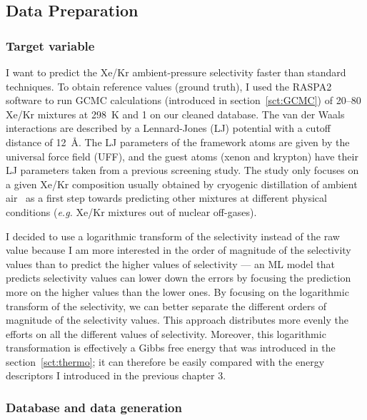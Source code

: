 \documentclass[main]{subfiles}
\begin{document}
\subsection{Data Preparation}


\subsubsection{Target variable}

I want to predict the Xe/Kr ambient-pressure selectivity faster than standard techniques. To obtain reference values (ground truth), I used the RASPA2 software\autocite{dubbeldam2016} to run GCMC calculations (introduced in section~\ref{sct:GCMC}) of 20–80 Xe/Kr mixtures at \SI{298}{\kelvin} and \SI{1}{\atm} on our cleaned database. The van der Waals interactions are described by a Lennard-Jones (LJ) potential with a cutoff distance of \SI{12}{\angstrom}. The LJ parameters of the framework atoms are given by the universal force field (UFF),\autocite{rappe1992} and the guest atoms (xenon and krypton) have their LJ parameters taken from a previous screening study.\autocite{Ryan_2010} The study only focuses on a given Xe/Kr composition usually obtained by cryogenic distillation of ambient air~\autocite{kerry2007industrial} as a first step towards predicting other mixtures at different physical conditions (\emph{e.g.} Xe/Kr mixtures out of nuclear off-gases). 

I decided to use a logarithmic transform of the selectivity instead of the raw value because I am more interested in the order of magnitude of the selectivity values than to predict the higher values of selectivity --- an ML model that predicts selectivity values can lower down the errors by focusing the prediction more on the higher values than the lower ones. By focusing on the logarithmic transform of the selectivity, we can better separate the different orders of magnitude of the selectivity values. This approach distributes more evenly the efforts on all the different values of selectivity. Moreover, this logarithmic transformation is effectively a Gibbs free energy that was introduced in the section~\ref{sct:thermo}; it can therefore be easily compared with the energy descriptors I introduced in the previous chapter 3.

\subsubsection{Database and data generation}
\end{document}
